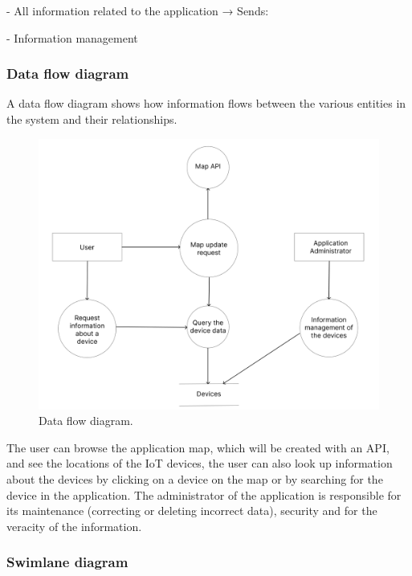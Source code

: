 - All information related to the application
\newline
→ Sends:

- Information management

\subsubsection*{Data flow diagram}

A data flow diagram shows how information flows between the various entities
in the system and their relationships.
\begin{figure}[H]
    \centering
    \includegraphics[width=15cm]{../app/docs/software_requirements/assets/images/data_flow_diagram.png}
    \caption{Data flow diagram.}
    \label{fig:data flow diagram}
\end{figure}
The user can browse the application map, which will be created with an API,
and see the locations of the IoT devices, the user can also look up information
about the devices by clicking on a device on the map or by searching for
the device in the application. The administrator of the application is responsible for
its maintenance (correcting or deleting incorrect data), security and for
the veracity of the information.

\subsubsection*{Swimlane diagram}

